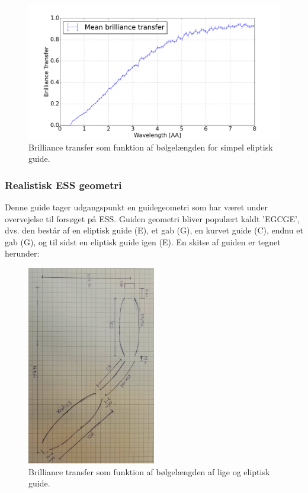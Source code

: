 \documentclass[12pt,oneside,a4paper]{article}
\begin{document}
{{{{{\begin{figure}[H]
\centering
\includegraphics[width=1\textwidth]{optimized_mean_4.png}
\caption{Brilliance transfer som funktion af bølgelængden for simpel eliptisk guide.}
\end{figure}




\subsubsection{Realistisk ESS geometri}
Denne guide tager udgangspunkt en guidegeometri som har været under overvejelse til forsøget på ESS. Guiden geometri bliver populært kaldt 'EGCGE', dvs. den består af en eliptisk guide (E), et gab (G), en kurvet guide (C), endnu et gab (G), og til sidst en eliptisk guide igen (E). En skitse af guiden er tegnet herunder:

\begin{figure}[H]
\centering
\includegraphics[width=0.5\textwidth, angle=90]{EGCGE.JPG}
\caption{Brilliance transfer som funktion af bølgelængden af lige og eliptisk guide.}
\end{figure}

}}}}}
\end{document}
